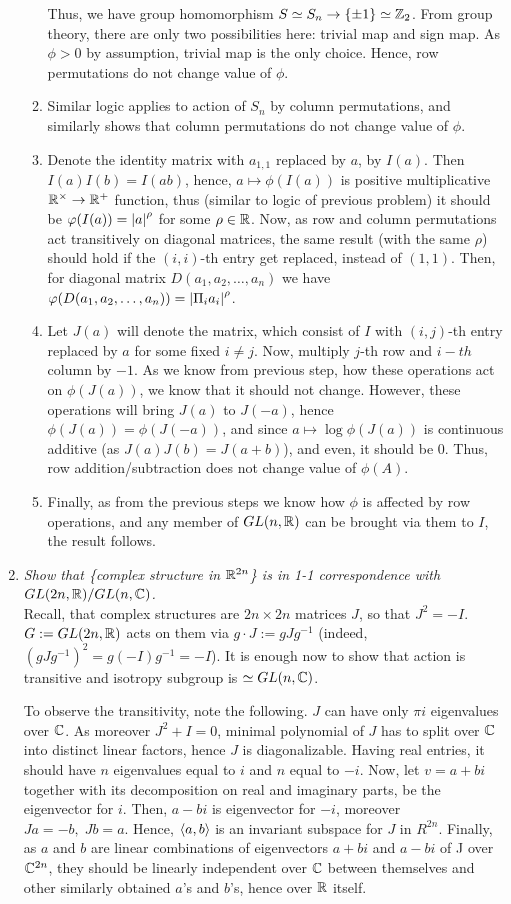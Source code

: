 \documentclass[10pt]{article} %
\begin{document}
\begin{enumerate}[1. ]
\begin{enumerate}[1$^\circ$]
Thus, we have group homomorphism $S\simeq S_n\to\left\{\pm1\right\}\simeq\mathbb{Z}_2$. From group theory, there are only two possibilities here: trivial map 
and sign map. As $\phi>0$ by assumption, trivial map is the only choice. Hence, row permutations do not change value of $\phi$.
\item Similar logic applies to action of $S_n$ by column permutations, and similarly shows that column permutations do not change value of $\phi$.
\item Denote the identity matrix with $a_{1,1}$ replaced by $a$, by $I(a)$. Then $I(a)I(b)=I(ab)$, hence, $a\mapsto\phi(I(a))$ is positive
multiplicative $\mathbb{R}^\times\to\mathbb{R}^+$ function, thus (similar to logic of previous problem) it should be $\varphi(I(a))=\left|a\right|^\rho$ for some 
$\rho\in\mathbb{R}$. Now,
as row and column permutations act transitively on diagonal matrices, the same result (with the same $\rho$) should hold if the $(i,i)$-th
entry get replaced, instead of $(1,1)$. Then, for diagonal matrix $D(a_1,a_2,\hdots,a_n)$ we have $\varphi(D(a_1,a_2,\hdots,a_n))=\left|\Pi_i a_i\right|^\rho
$.
\item Let $J(a)$ will denote the matrix, which consist of $I$ with $(i,j)$-th entry replaced by $a$ for some fixed $i\neq j$.
Now, multiply $j$-th row and $i-th$ column  by $-1$. As we know from previous step, how these operations act on $\phi(J(a))$, we know
that it should not change. However, these operations will bring $J(a)$ to $J(-a)$, hence $\phi(J(a))=\phi(J(-a))$, and since $a\mapsto\log\phi(J(a))$
is continuous additive (as $J(a)J(b)=J(a+b)$), and even, it should be 0. Thus, row addition/subtraction does not change value of $\phi(A)$.
\item Finally, as from the previous steps we know how $\phi$ is affected by row operations, and any member of $GL(n,\mathbb{R})$ can be brought via
them to $I$, the result follows.
\end{enumerate}
\item\textit{Show that \{complex structure in $\mathbb{R}^{2n}$\} is in 1-1 correspondence with $GL(2n,\mathbb{R})/GL(n,\mathbb{C})$.}\\
Recall, that complex structures are $2n\times2n$ matrices $J$, so that $J^2=-I$. $G:=GL(2n,\mathbb{R})$ acts on them via
$g\cdot J:=gJg^{-1}$ (indeed, $(gJg^{-1})^2=g(-I)g^{-1}=-I$).
It is enough now to show that action is transitive and isotropy subgroup is $\simeq GL(n,\mathbb{C})$. 

To observe the transitivity, note the following. $J$ can have only $\pi i$ eigenvalues over $\mathbb{C}$. As moreover $J^2+I=0$, minimal polynomial of
$J$ has to split over $\mathbb{C}$ into distinct linear factors, hence $J$ is diagonalizable. Having real entries, it should have $n$ eigenvalues equal to 
$i$ and $n$ equal to $-i$. Now, let $v=a+bi$ together with its decomposition on real and imaginary parts, be the eigenvector for $i$. Then,
$a-bi$ is eigenvector for $-i$, moreover $Ja=-b,\;Jb=a$. Hence, $\left<a,b\right>$ is an invariant subspace for $J$ in $R^{2n}$. Finally, as $a$ and $b$
are linear combinations of eigenvectors $a+bi$ and $a-bi$ of J over $\mathbb{C}^{2n}$, they should be linearly independent over $\mathbb{C}$ between themselves
and other similarly obtained $a$'s and $b$'s, hence over $\mathbb{R}$ itself. 


\end{enumerate}
\end{document}
